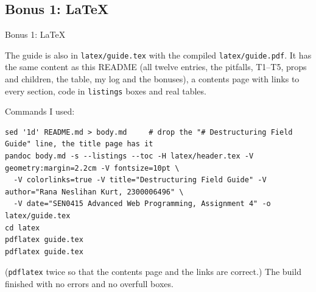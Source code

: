 \documentclass[
  10pt,
]{article}
\newcommand{\passthrough}[1]{#1}
\begin{document}
\hypertarget{bonus-1-latex}{%
\subsection{Bonus 1: LaTeX}\label{bonus-1-latex}}

Bonus 1: LaTeX

The guide is also in \passthrough{\lstinline!latex/guide.tex!} with the
compiled \passthrough{\lstinline!latex/guide.pdf!}. It has the same
content as this README (all twelve entries, the pitfalls, T1--T5, props
and children, the table, my log and the bonuses), a contents page with
links to every section, code in \passthrough{\lstinline!listings!} boxes
and real tables.

Commands I used:

\begin{lstlisting}
sed '1d' README.md > body.md     # drop the "# Destructuring Field Guide" line, the title page has it
pandoc body.md -s --listings --toc -H latex/header.tex -V geometry:margin=2.2cm -V fontsize=10pt \
  -V colorlinks=true -V title="Destructuring Field Guide" -V author="Rana Neslihan Kurt, 2300006496" \
  -V date="SEN0415 Advanced Web Programming, Assignment 4" -o latex/guide.tex
cd latex
pdflatex guide.tex
pdflatex guide.tex
\end{lstlisting}

(\passthrough{\lstinline!pdflatex!} twice so that the contents page and
the links are correct.) The build finished with no errors and no
overfull boxes.
\end{document}
